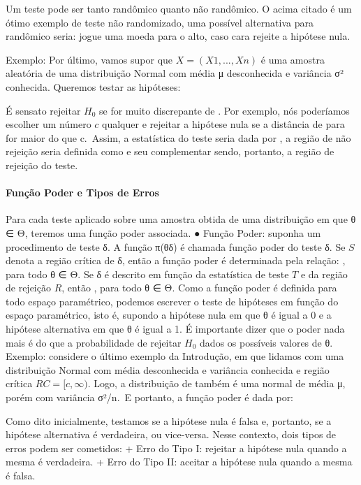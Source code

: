 \documentclass[
]{article}
\begin{document}
Um teste pode ser tanto randômico quanto não randômico. O acima citado é
um ótimo exemplo de teste não randomizado, uma possível alternativa para
randômico seria: jogue uma moeda para o alto, caso cara rejeite a
hipótese nula.

Exemplo: Por último, vamos supor que \(X = (X1,...,Xn)\) é uma amostra
aleatória de uma distribuição Normal com média μ desconhecida e
variância σ² conhecida. Queremos testar as hipóteses:

É sensato rejeitar \(H_0\) se for muito discrepante de . Por exemplo,
nós poderíamos escolher um número \(c\) qualquer e rejeitar a hipótese
nula se a distância de para for maior do que c.~Assim, a estatística do
teste seria dada por , a região de não rejeição seria definida como e
seu complementar sendo, portanto, a região de rejeição do teste.

\hypertarget{funuxe7uxe3o-poder-e-tipos-de-erros}{%
\paragraph{Função Poder e Tipos de
Erros}\label{funuxe7uxe3o-poder-e-tipos-de-erros}}

Para cada teste aplicado sobre uma amostra obtida de uma distribuição em
que θ ∈ Θ, teremos uma função poder associada. ● Função Poder: suponha
um procedimento de teste δ. A função π(θ\textbar δ) é chamada função
poder do teste δ. Se \(S\) denota a região crítica de δ, então a função
poder é determinada pela relação: , para todo θ ∈ Θ. Se δ é descrito em
função da estatística de teste \(T\) e da região de rejeição \(R\),
então , para todo θ ∈ Θ. Como a função poder é definida para todo espaço
paramétrico, podemos escrever o teste de hipóteses em função do espaço
paramétrico, isto é, supondo a hipótese nula em que θ é igual a 0 e a
hipótese alternativa em que θ é igual a 1. É importante dizer que o
poder nada mais é do que a probabilidade de rejeitar \(H_0\) dados os
possíveis valores de θ. Exemplo: considere o último exemplo da
Introdução, em que lidamos com uma distribuição Normal com média
desconhecida e variância conhecida e região crítica \(RC = [c,∞)\).
Logo, a distribuição de também é uma normal de média μ, porém com
variância σ²/n.~E portanto, a função poder é dada por:

Como dito inicialmente, testamos se a hipótese nula é falsa e, portanto,
se a hipótese alternativa é verdadeira, ou vice-versa. Nesse contexto,
dois tipos de erros podem ser cometidos: + Erro do Tipo I: rejeitar a
hipótese nula quando a mesma é verdadeira. + Erro do Tipo II: aceitar a
hipótese nula quando a mesma é falsa.
\end{document}
